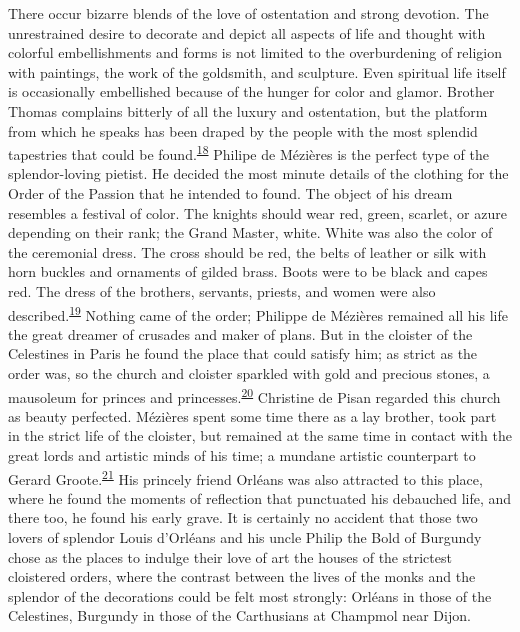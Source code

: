 There occur bizarre blends of the love of ostentation and strong
devotion. The unrestrained desire to decorate and depict all aspects of
life and thought with colorful embellishments and forms is not limited
to the overburdening of religion with paintings, the work of the
goldsmith, and sculpture. Even spiritual life itself is occasionally
embellished because of the hunger for color and glamor. Brother Thomas
complains bitterly of all the luxury and ostentation, but the platform
from which he speaks has been draped by the people with the most
splendid tapestries that could be
found.\textsuperscript{\protect\hypertarget{14_Chapter_Seven__THE_PIOUS_PERSONA.xhtmlux5cux23id_988}{\protect\hyperlink{23_NOTES.xhtmlux5cux23id_989}{18}}}
Philipe de Mézières is the perfect type of the splendor-loving pietist.
He decided the most minute details of the clothing for the Order of the
Passion that he intended to found. The object of his dream resembles a
festival of color. The knights should wear red, green, scarlet, or azure
depending on their rank; the Grand Master, white. White was also the
color of the ceremonial dress. The cross should be red, the belts of
leather or silk with horn buckles and ornaments of gilded brass. Boots
were to be black and capes red. The dress of the brothers, servants,
priests, and women were also
described.\textsuperscript{\protect\hypertarget{14_Chapter_Seven__THE_PIOUS_PERSONA.xhtmlux5cux23id_986}{\protect\hyperlink{23_NOTES.xhtmlux5cux23id_987}{19}}}
Nothing came of the order; Philippe de Mézières remained all his life
the great dreamer of crusades and maker of plans. But in the cloister of
the Celestines in Paris he found the place that could satisfy him; as
strict as the order was, so the church and cloister sparkled with gold
and precious stones, a mausoleum for princes and
princesses.\textsuperscript{\protect\hypertarget{14_Chapter_Seven__THE_PIOUS_PERSONA.xhtmlux5cux23id_984}{\protect\hyperlink{23_NOTES.xhtmlux5cux23id_985}{20}}}
Christine de Pisan regarded this church as beauty perfected. Mézières
spent some time there as a lay brother, took part in the strict life of
the cloister, but remained at the same time in contact with the great
lords and artistic minds of his time; a mundane artistic counterpart to
Gerard
Groote.\textsuperscript{\protect\hypertarget{14_Chapter_Seven__THE_PIOUS_PERSONA.xhtmlux5cux23id_982}{\protect\hyperlink{23_NOTES.xhtmlux5cux23id_983}{21}}}
His princely friend Orléans was also attracted to this place, where he
found the moments of reflection that punctuated his debauched life, and
there too, he found his early grave. It is certainly no accident that
those two lovers of splendor Louis d'Orléans and his uncle Philip the
Bold of Burgundy chose as the places to indulge their love of art the
houses of the strictest cloistered orders, where the contrast between
the lives of the monks and the splendor of the decorations
\protect\hypertarget{14_Chapter_Seven__THE_PIOUS_PERSONA.xhtmlux5cux23page_209}{}{}could
be felt most strongly: Orléans in those of the Celestines, Burgundy in
those of the Carthusians at Champmol near Dijon.


